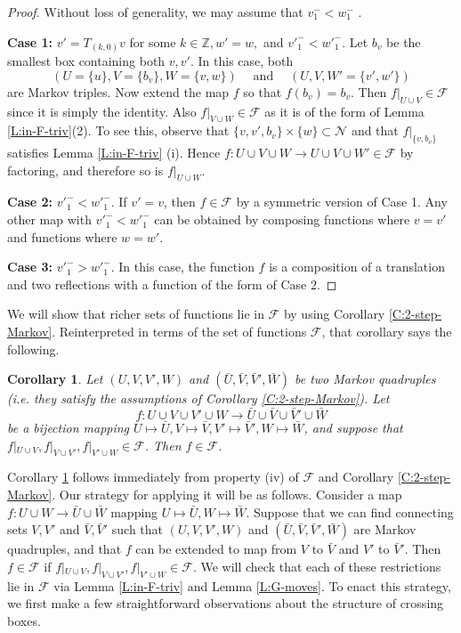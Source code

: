 \documentclass[aop, preprint]{imsart}
\theoremstyle{plain}
\newtheorem{corollary}[theorem]{Corollary}
\theoremstyle{definition}
\theoremstyle{plain}
\newcommand{\sset}{\subset}
\newcommand{\mathand}{\;\text{and}\;}
\newcommand{\scrN}{\mathcal{N}}
\newcommand{\scrF}{\mathcal{F}}
\newcommand{\Z}{\mathds{Z}}
\newcommand{\X}{\times}
\begin{document}
\begin{proof}
	Without loss of generality, we may assume that  $v^-_1 < w^-_1$ .
	
	\textbf{Case 1:} $v' = T_{(k, 0)} v$ for some $k \in \Z, w' = w,$ and $v'^-_1 < w'^-_1$. Let $b_v$ be the smallest box containing both $v, v'$. In this case, both
	$$
	(U = \{u\}, V = \{b_v \}, W = \{v, w\}) \quad \mathand \quad (U, V, W' = \{v', w'\})
	$$
	are Markov triples. Now extend the map $f$ so that $f(b_v) = b_v$. Then $f|_{U \cup V} \in \scrF$ since it is simply the identity. Also $f|_{V \cup W} \in \scrF$ as it is of the form of Lemma \ref{L:in-F-triv}(2). To see this, observe that $\{v, v', b_v\} \X \{w \} \sset \scrN$ and that $f|_{\{v, b_v\}}$ satisfies Lemma \ref{L:in-F-triv} (i). Hence $f:U \cup V\cup W \to U \cup V \cup W' \in \scrF$ by factoring, and therefore so is $f|_{U \cup W}$. 
	
	\textbf{Case 2:} ${v'}^-_1 < {w'}^-_1$. If $v' = v$, then $f \in \scrF$ by a symmetric version of Case 1. Any other map with ${v'}^-_1 < {w'}^-_1$ can be obtained by composing functions where $v = v'$ and functions where $w = w'$.
	
	\textbf{Case 3:} ${v'}^-_1 > {w'}^-_1$. In this case, the function $f$ is a composition of a translation and two reflections with a function of the form of Case 2.
\end{proof}

We will show that richer sets of functions lie in $\scrF$ by using Corollary \ref{C:2-step-Markov}. Reinterpreted in terms of the set of functions $\scrF$, that corollary says the following.

\begin{corollary}
	\label{C:2-step-markov'}
	Let $(U, V, V', W)$ and $(\bar U, \bar V, \bar V', \bar W)$ be two Markov quadruples (i.e. they satisfy the assumptions of Corollary \ref{C:2-step-Markov}). Let 
	$$
	f: U \cup V \cup V' \cup W \to \bar U \cup \bar V \cup \bar V' \cup \bar W
	$$
	be a bijection mapping $U \mapsto \bar U, V \mapsto \bar V, V' \mapsto \bar V', W \mapsto \bar W$, and suppose that $f|_{U \cup V}, f|_{V \cup V'}, f|_{V' \cup W} \in \scrF$. Then $f \in \scrF$. 
\end{corollary}

Corollary \ref{C:2-step-markov'} follows immediately from property (iv) of $\scrF$ and Corollary \ref{C:2-step-Markov}. Our strategy for applying it will be as follows. Consider a map $f:U \cup W \to \bar U \cup \bar W$ mapping $U \mapsto \bar U, W \mapsto \bar W$. Suppose that we can find connecting sets $V, V'$ and $\bar V, \bar V'$ such that $(U, V, V', W)$ and $(\bar U, \bar V, \bar V', \bar W)$ are Markov quadruples, and that $f$ can be extended to map from $V$ to $\bar V$ and $V'$ to $\bar V'$. Then $f \in \scrF$ if $f|_{U \cup V}, f|_{V \cup V'}, f|_{V' \cup W} \in \scrF$. We will check that each of these restrictions lie in $\scrF$ via Lemma \ref{L:in-F-triv} and Lemma \ref{L:G-moves}.
To enact this strategy, we first make a few straightforward observations about the structure of crossing boxes.
\end{document}
